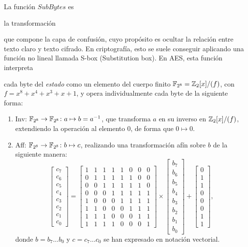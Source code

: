 La función $SubBytes$ es \begin{Revision}la transformación\end{Revision} que compone la capa de confusión, cuyo propósito es ocultar la relación entre texto claro y texto cifrado. En criptografía, esto se suele conseguir aplicando una función no lineal llamada S-box (Substitution box). En AES, esta función interpreta \begin{Revision}cada byte del \textit{estado} como un elemento del cuerpo finito $\mathbb{F}_{2^8} = \mathbb{Z}_2[x]/(f)$, con $f = x^8 + x^4 + x^3 + x + 1$, y opera individualmente cada byte de la siguiente forma:\end{Revision}
\begin{enumerate}[label={--}]
    \item Inv: $\mathbb{F}_{2^8} \to \mathbb{F}_{2^8} \colon a \mapsto b = a^{-1}$, que transforma $a$ en su inverso en $\mathbb{Z}_2[x]/(f)$, extendiendo la operación al elemento $0$, de forma que $ 0 \mapsto 0$.
    \item Aff: $\mathbb{F}_{2^8} \to \mathbb{F}_{2^8} \colon b \mapsto c$, realizando una transformación afín sobre $b$ de la siguiente manera:
\[
    \begin{bmatrix} 
    c_7 \\ c_6 \\ c_5 \\ c_4 \\ c_3 \\ c_2 \\ c_1 \\ c_0 
    \end{bmatrix} 
= 
    \begin{bmatrix} 
    1 & 1 & 1 & 1 & 1 & 0 & 0 & 0 \\ 
    0 & 1 & 1 & 1 & 1 & 1 & 0 & 0 \\ 
    0 & 0 & 1 & 1 & 1 & 1 & 1 & 0 \\ 
    0 & 0 & 0 & 1 & 1 & 1 & 1 & 1 \\
    1 & 0 & 0 & 0 & 1 & 1 & 1 & 1 \\ 
    1 & 1 & 0 & 0 & 0 & 1 & 1 & 1 \\ 
    1 & 1 & 1 & 0 & 0 & 0 & 1 & 1 \\ 
    1 & 1 & 1 & 1 & 0 & 0 & 0 & 1     
    \end{bmatrix} 
\times 
    \begin{bmatrix} 
    b_7 \\ b_6 \\ b_5 \\ b_4 \\ b_3 \\ b_2 \\ b_1 \\ b_0 
    \end{bmatrix} 
+ 
    \begin{bmatrix} 
    0 \\ 1 \\ 1 \\ 0 \\ 0 \\ 0 \\ 1 \\ 1 
    \end{bmatrix},
\]
donde $b = b_7\ldots b_0$ y $c =  c_7\ldots c_0$ se han expresado en notación vectorial.
\end{enumerate}
